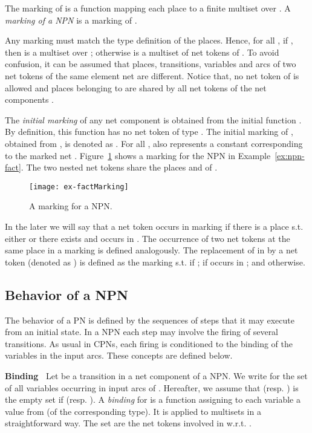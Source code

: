 \documentclass{llncs}
\begin{document}
The marking of   is a function mapping each place  to a finite multiset over . A \emph{marking of a NPN}  is a marking of .

Any marking must match the type definition of the places. Hence, for all , if , then  is a multiset over ; otherwise  is a multiset of net tokens of .  To avoid confusion, it can be assumed that places, transitions, variables and arcs of two net tokens of the same element net are different. Notice that, no net token of  is allowed and places belonging to  are shared by all net tokens of the net components .

The \emph{initial marking} of any net component is obtained from the initial function . By definition, this function has no net token of type . The initial marking of , obtained from , is denoted as . For all ,  also represents a constant corresponding to the marked net . Figure~\ref{figRPNFactMarking} shows a marking for the NPN in Example~\ref{ex:npn-fact}. The two nested net tokens share the places  and  of .


\begin{figure}
\begin{center}
\texttt{[image: ex-factMarking]}
\end{center}
\vspace{-10pt}
\caption{A marking for a NPN.}
\label{figRPNFactMarking}
\end{figure}



In the later we will say that a net token  occurs in marking  if there is a place  s.t. either   or there exists  and  occurs in . The occurrence of two net tokens at the same place in a marking is defined analogously. The replacement of  in  by a net token  (denoted as ) is defined as the marking  s.t.  if ;  if  occurs in ; and  otherwise.

\subsection{Behavior of a NPN}

The behavior of a PN is defined by the sequences of steps that it may execute from an initial state. In a NPN each step may involve the firing of several transitions. As usual in CPNs, each firing is conditioned to the binding of the variables in the input arcs. These concepts are defined below.

\noindent\textbf{Binding\ }  Let  be a transition in a net component  of a NPN. We write  for the set of all variables occurring in input arcs of . Hereafter, we assume that  (resp. ) is the empty set if  (resp. ). A \emph{binding} for  is a function  assigning to each variable  a value from  (of the corresponding type). It is applied to multisets in a straightforward way. The set  are the net tokens involved in  w.r.t. .
\end{document}
